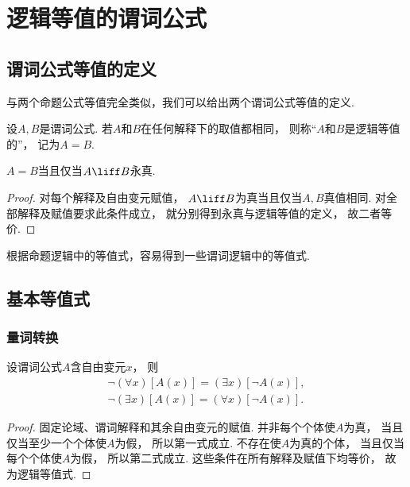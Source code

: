 \section{逻辑等值的谓词公式}
\subsection{谓词公式等值的定义}
与两个命题公式等值完全类似，我们可以给出两个谓词公式等值的定义.
\begin{definition}
设\(A,B\)是谓词公式.
若\(A\)和\(B\)在任何解释下的取值都相同，
则称“\(A\)和\(B\)是逻辑等值的”，
记为\(A=B\).
\end{definition}

\begin{proposition}
    \(A=B\)当且仅当\(A\liff B\)永真.
    \begin{proof}
        对每个解释及自由变元赋值，
        \(A\liff B\)为真当且仅当\(A,B\)真值相同.
        对全部解释及赋值要求此条件成立，
        就分别得到永真与逻辑等值的定义，
        故二者等价.
    \end{proof}
\end{proposition}

根据命题逻辑中的等值式，容易得到一些谓词逻辑中的等值式.

\subsection{基本等值式}
\subsubsection{量词转换}
设谓词公式\(A\)含自由变元\(x\)，
则\begin{gather}
	\neg(\forall x)[A(x)]
	= (\exists x)[\neg A(x)],
	\label{equation:数理逻辑.量词转换1} \\
	\neg(\exists x)[A(x)]
	= (\forall x)[\neg A(x)].
	\label{equation:数理逻辑.量词转换2}
\end{gather}
\begin{proof}
    固定论域、谓词解释和其余自由变元的赋值.
    并非每个个体使\(A\)为真，
    当且仅当至少一个个体使\(A\)为假，
    所以第一式成立.
    不存在使\(A\)为真的个体，
    当且仅当每个个体使\(A\)为假，
    所以第二式成立.
    这些条件在所有解释及赋值下均等价，
    故为逻辑等值式.
\end{proof}


